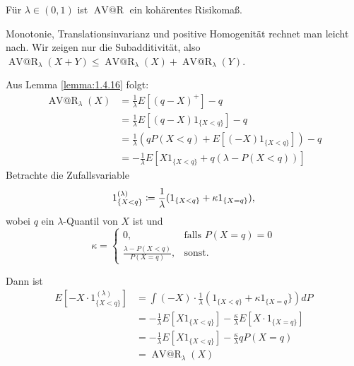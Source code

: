 \documentclass[a4paper,twoside,DIV15,BCOR12mm]{scrbook}
\makeatletter
\DeclareMathOperator{\AVatR}{AV@R}
\makeatother
\begin{document}
\begin{satz}
Für $\lambda\in(0,1)$ ist $\AVatR$ ein kohärentes Risikomaß.
\end{satz}
\begin{beweis}
Monotonie, Translationsinvarianz und positive Homogenität rechnet man leicht nach. Wir zeigen nur die Subadditivität, also $\AVatR_\lambda(X+Y) \le \AVatR_\lambda(X) + \AVatR_\lambda(Y)$.

Aus Lemma \ref{lemma:1.4.16} folgt: 
\begin{align*}
\AVatR_\lambda(X) &= \frac1\lambda E[(q-X)^+] -q \\
&= \frac1\lambda E[(q-X)1_{\{X<q\}}]-q \\
&= \frac1\lambda (qP(X<q) + E[(-X)1_{\{X<q\}}])-q \\
&= -\frac1\lambda E[X 1_{\{X<q\}} + q(\lambda - P(X<q))]
\end{align*}
Betrachte die Zufallsvariable \[1_{\{X<q\}}^{(\lambda)}\da \frac1\lambda (1_{\{X<q\}} + \kappa 1_{\{X=q\}}),\] wobei $q$ ein $\lambda$-Quantil von $X$ ist und
\[
\kappa = 
\begin{cases}
0, &\text{falls } P(X=q)=0 \\
\frac{\lambda-P(X<q)}{P(X=q)}, & \text{sonst.}
\end{cases}
\]

Dann ist 
\begin{align*}
E[-X\cdot 1_{\{X<q\}}^{(\lambda)}] &= \int (-X) \cdot \frac1\lambda (1_{\{X<q\}} + \kappa 1_{\{X=q}\}) dP \\
&= -\frac1\lambda E[X1_{\{X<q\}}] - \frac\kappa\lambda E[X \cdot 1_{\{X=q\}}] \\
&= -\frac1\lambda E[X1_{\{X<q\}}] - \frac\kappa\lambda qP(X=q) \\
&= \AVatR_\lambda(X)
\end{align*}


\end{beweis}
\end{document}
